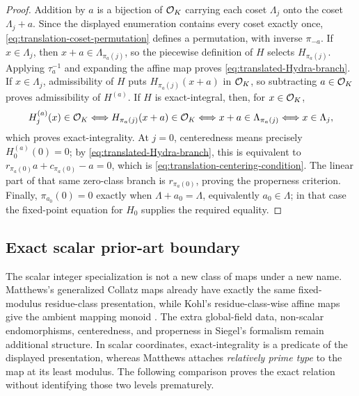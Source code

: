 \begin{proof}
Addition by $a$ is a bijection of $\mathcal O_K$ carrying each coset
$\Lambda_j$ onto the coset $\Lambda_j+a$.  Since the displayed enumeration
contains every coset exactly once, \cref{eq:translation-coset-permutation}
defines a permutation, with inverse $\pi_{-a}$.  If $x\in\Lambda_j$, then
$x+a\in\Lambda_{\pi_a(j)}$, so the piecewise definition of $H$ selects
$H_{\pi_a(j)}$.  Applying $\tau_a^{-1}$ and expanding the affine map proves
\cref{eq:translated-Hydra-branch}.  If $x\in\Lambda_j$, admissibility of $H$
puts $H_{\pi_a(j)}(x+a)$ in $\mathcal O_K$, so subtracting $a\in\mathcal O_K$ proves
admissibility of $H^{(a)}$.  If $H$ is exact-integral, then, for $x\in\mathcal O_K$,
\[
 H^{(a)}_j(x)\in\mathcal O_K
 \Longleftrightarrow H_{\pi_a(j)}(x+a)\in\mathcal O_K
 \Longleftrightarrow x+a\in\Lambda_{\pi_a(j)}
 \Longleftrightarrow x\in\Lambda_j,
\]
which proves exact-integrality.  At $j=0$, centeredness means precisely
$H^{(a)}_0(0)=0$; by \cref{eq:translated-Hydra-branch}, this is equivalent to
$r_{\pi_a(0)}a+c_{\pi_a(0)}-a=0$, which is
\cref{eq:translation-centering-condition}.  The linear part of that same
zero-class branch is $r_{\pi_a(0)}$, proving the properness criterion.  Finally,
$\pi_{a_0}(0)=0$ exactly when $\Lambda+a_0=\Lambda$, equivalently
$a_0\in\Lambda$; in that case the fixed-point equation for $H_0$ supplies
the required equality.
\end{proof}

\subsection{Exact scalar prior-art boundary}

The scalar integer specialization is not a new class of maps under a new
name.  Matthews's generalized Collatz maps already have exactly the same
fixed-modulus residue-class presentation, while Kohl's residue-class-wise
affine maps give the ambient mapping monoid
\cite[Sec.~2]{MatthewsGeneralized}\cite[Defs.~1.1 and~1.4]{KohlRCWA}.
The extra global-field data, non-scalar endomorphisms, centeredness, and
properness in Siegel's formalism remain additional structure.  In scalar
coordinates, exact-integrality is a predicate of the displayed presentation,
whereas Matthews attaches \emph{relatively prime type} to the map at its least
modulus.  The following comparison proves the exact relation without
identifying those two levels prematurely.

